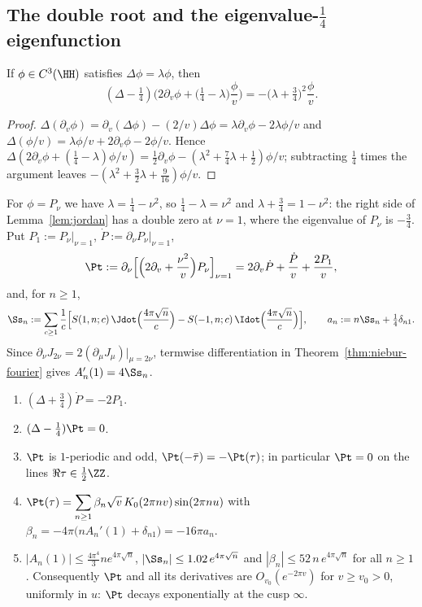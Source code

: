 \subsection{The double root and the eigenvalue-\texorpdfstring{$\frac14$}{1/4} eigenfunction}

\begin{lemma}\label{lem:jordan}
If $\phi\in C^3(\HH)$ satisfies $\Delta\phi=\lambda\phi$, then
\[
(\Delta-\tfrac14)\Big(2\partial_v\phi+\big(\tfrac14-\lambda\big)\frac\phi v\Big)=-\big(\lambda+\tfrac34\big)^2\frac\phi v .
\]
\end{lemma}

\begin{proof}
$\Delta(\partial_v\phi)=\partial_v(\Delta\phi)-(2/v)\Delta\phi=\lambda\partial_v\phi-2\lambda\phi/v$ and $\Delta(\phi/v)=\lambda\phi/v+2\partial_v\phi-2\phi/v$.
Hence $\Delta(2\partial_v\phi+(\frac14-\lambda)\phi/v)=\frac12\partial_v\phi-(\lambda^2+\frac74\lambda+\frac12)\phi/v$; subtracting $\frac14$ times the
argument leaves $-(\lambda^2+\frac32\lambda+\frac9{16})\phi/v$.
\end{proof}

For $\phi=P_\nu$ we have $\lambda=\frac14-\nu^2$, so $\frac14-\lambda=\nu^2$ and $\lambda+\frac34=1-\nu^2$: the right side of Lemma~\ref{lem:jordan}
has a double zero at $\nu=1$, where the eigenvalue of $P_\nu$ is $-\frac34$. Put $P_1:=P_\nu|_{\nu=1}$, $\dot P:=\partial_\nu P_\nu|_{\nu=1}$,
\begin{equation}\label{eq:Pt}
\Pt:=\partial_\nu\Big[\Big(2\partial_v+\frac{\nu^2}v\Big)P_\nu\Big]_{\nu=1}=2\partial_v\dot P+\frac{\dot P}v+\frac{2P_1}v ,
\end{equation}
and, for $n\ge1$,
\begin{equation}\label{eq:an}
\Ss_n:=\sum_{c\ge1}\frac1c\Big[S(1,n;c)\,\Jdot\Big(\frac{4\pi\sqrt n}c\Big)-S(-1,n;c)\,\Idot\Big(\frac{4\pi\sqrt n}c\Big)\Big],\qquad
a_n:=n\Ss_n+\tfrac14\delta_{n1}.
\end{equation}
Since $\partial_\nu J_{2\nu}=2(\partial_\mu J_\mu)|_{\mu=2\nu}$, termwise differentiation in Theorem~\ref{thm:niebur-fourier} gives $A_n'(1)=4\Ss_n$.

\begin{proposition}\label{prop:Pt}
\begin{enumerate}[label=\textup{(\alph*)}]
\item $(\Delta+\frac34)\dot P=-2P_1$.
\item $(\Delta-\frac14)\Pt=0$.
\item $\Pt$ is $1$-periodic and odd, $\Pt(-\bar\tau)=-\Pt(\tau)$; in particular $\Pt=0$ on the lines $\Re\tau\in\frac12\ZZ$.
\item $\displaystyle\Pt(\tau)=\sum_{n\ge1}\beta_n\sqrt v\,K_0(2\pi nv)\sin(2\pi nu)$ with $\beta_n=-4\pi\big(nA_n'(1)+\delta_{n1}\big)=-16\pi a_n$.
\item $|A_n(1)|\le\frac{4\pi^4}3ne^{4\pi\sqrt n}$, $|\Ss_n|\le1.02\,e^{4\pi\sqrt n}$ and $|\beta_n|\le52\,n\,e^{4\pi\sqrt n}$ for all $n\ge1$.
Consequently $\Pt$ and all its derivatives are $O_{v_0}(e^{-2\pi v})$ for $v\ge v_0>0$, uniformly in $u$: $\Pt$ decays exponentially at the
cusp $\infty$.
\end{enumerate}
\end{proposition}


